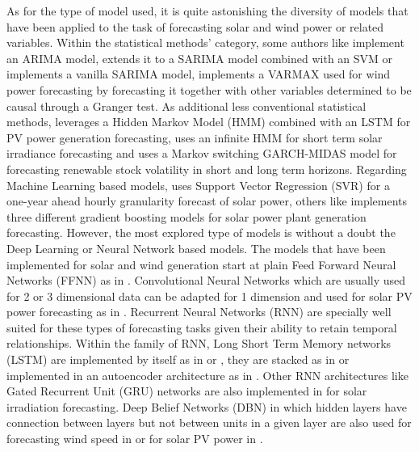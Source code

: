 As for the type of model used, it is quite astonishing the diversity of models that have been applied to the task of forecasting solar and wind power or related variables. Within the statistical methods' category, some authors like \cite{pedro_coimbra_2012} implement an ARIMA model, \cite{m_bouzerdoum_mellit_pavan_2013} extends it to a SARIMA model combined with an SVM or \cite{haddad_nicod_2019} implements a vanilla SARIMA model, \cite{jain_none_behera_2022} implements a VARMAX used for wind power forecasting by forecasting it together with other variables determined to be causal through a Granger test. As additional less conventional statistical methods, \cite{delgado_estefan_neill_carrillo_andrade_2024} leverages a Hidden Markov Model (HMM) combined with an LSTM for PV power generation forecasting, \cite{frimane_munkhammar_van_meer_2022} uses an infinite HMM for short term solar irradiance forecasting and \cite{wang_wu_cao_hong_2022} uses a Markov switching GARCH-MIDAS model for forecasting renewable stock volatility in short and long term horizons. 
Regarding Machine Learning based models, \cite{abuella_chowdhury_2016} uses Support Vector Regression (SVR) for a one-year ahead hourly granularity forecast of solar power, others like \cite{aksoy_istemihan_genc_2023} implements three different gradient boosting models for solar power plant generation forecasting. 
However, the most explored type of models is without a doubt the Deep Learning or Neural Network based models. The models that have been implemented for solar and wind generation start at plain Feed Forward Neural Networks (FFNN) as in \cite{pedro_coimbra_2012}. Convolutional Neural Networks which are usually used for 2 or 3 dimensional data can be adapted for 1 dimension and used for solar PV power forecasting as in \cite{huang_kuo_2019}. Recurrent Neural Networks (RNN) are specially well suited for these types of forecasting tasks given their ability to retain temporal relationships. Within the family of RNN, Long Short Term Memory networks (LSTM) are implemented by itself as in \cite{abdel_nasser_mahmoud_2017} or \cite{hossain_mahmood_2020}, they are stacked as in \cite{liang_nguyen_jin_2018} or implemented in an autoencoder architecture as in \cite{suresh_janik_guerrero_leonowicz_sikorski_2020}. Other RNN architectures like Gated Recurrent Unit (GRU) networks are also implemented in \cite{learning_2017} for solar irradiation forecasting. Deep Belief Networks (DBN) in which hidden layers have connection between layers but not between units in a given layer are also used for forecasting wind speed in \cite{lin_pai_ting_2019} or for solar PV power in \cite{neo_teo_woo_t_logenthiran_sharma_2017}. 
